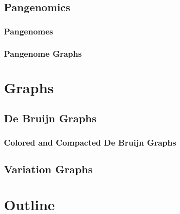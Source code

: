 \subsection*{Pangenomics}
\subsubsection*{Pangenomes}
\subsubsection*{Pangenome Graphs}

\section*{Graphs}

\subsection*{De Bruijn Graphs}
\subsubsection*{Colored and Compacted De Bruijn Graphs}
\subsection*{Variation Graphs}
\section*{Outline}
